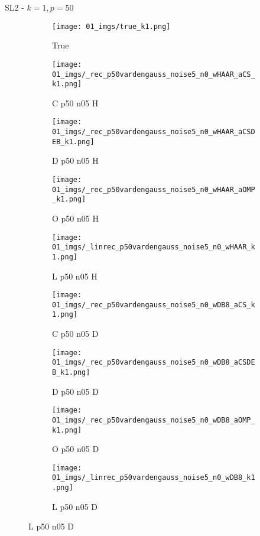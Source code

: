 \begin{frame}{SL2 - $k=1,p=50$}{}
\begin{figure}
\begin{subfigure}{0.1\textwidth}
\texttt{[image: 01\_imgs/true\_k1.png]}
\caption*{\Tiny True}
\end{subfigure}
\begin{subfigure}{0.1\textwidth}
\texttt{[image: 01\_imgs/\_rec\_p50vardengauss\_noise5\_n0\_wHAAR\_aCS\_k1.png]}
\caption*{\Tiny C p50 n05 H}
\end{subfigure}
\begin{subfigure}{0.1\textwidth}
\texttt{[image: 01\_imgs/\_rec\_p50vardengauss\_noise5\_n0\_wHAAR\_aCSDEB\_k1.png]}
\caption*{\Tiny D p50 n05 H}
\end{subfigure}
\begin{subfigure}{0.1\textwidth}
\texttt{[image: 01\_imgs/\_rec\_p50vardengauss\_noise5\_n0\_wHAAR\_aOMP\_k1.png]}
\caption*{\Tiny O p50 n05 H}
\end{subfigure}
\begin{subfigure}{0.1\textwidth}
\texttt{[image: 01\_imgs/\_linrec\_p50vardengauss\_noise5\_n0\_wHAAR\_k1.png]}
\caption*{\Tiny L p50 n05 H}
\end{subfigure}
\begin{subfigure}{0.1\textwidth}
\texttt{[image: 01\_imgs/\_rec\_p50vardengauss\_noise5\_n0\_wDB8\_aCS\_k1.png]}
\caption*{\Tiny C p50 n05 D}
\end{subfigure}
\begin{subfigure}{0.1\textwidth}
\texttt{[image: 01\_imgs/\_rec\_p50vardengauss\_noise5\_n0\_wDB8\_aCSDEB\_k1.png]}
\caption*{\Tiny D p50 n05 D}
\end{subfigure}
\begin{subfigure}{0.1\textwidth}
\texttt{[image: 01\_imgs/\_rec\_p50vardengauss\_noise5\_n0\_wDB8\_aOMP\_k1.png]}
\caption*{\Tiny O p50 n05 D}
\end{subfigure}
\begin{subfigure}{0.1\textwidth}
\texttt{[image: 01\_imgs/\_linrec\_p50vardengauss\_noise5\_n0\_wDB8\_k1.png]}
\caption*{\Tiny L p50 n05 D}
\end{subfigure}

\vspace{5pt}


\end{figure}
\end{frame}
